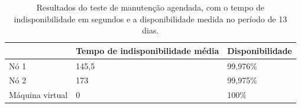 \begin{table}[h!]
\caption{Resultados do teste de manutenção agendada, com o tempo de indisponibilidade em segundos e a disponibilidade medida no período de 13 dias.}
\small
\label{tab:teste3resultados}
\begin{center}
\begin{tabular}{|l|p{7cm}|p{4cm}|}\hline
 & \textbf{Tempo de indisponibilidade média} & \textbf{Disponibilidade} \\\hline
Nó 1 & 145,5 & 99,976\% \\\hline
Nó 2 & 173 & 99,975\% \\\hline
Máquina virtual & 0 & 100\% \\\hline
\end{tabular}
\end{center}
\end{table}


% 

